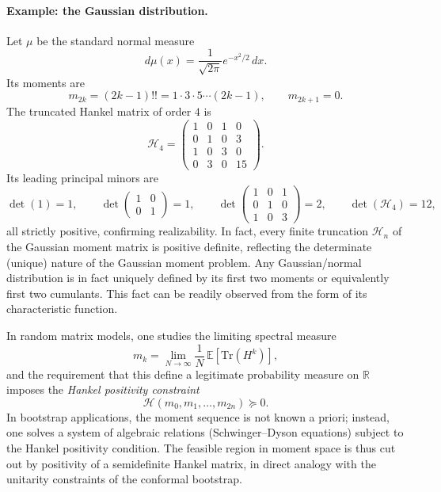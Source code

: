 \documentclass[11pt]{article}
\theoremstyle{plain}
\begin{document}
\medskip

\paragraph{Example: the Gaussian distribution.}
Let $\mu$ be the standard normal measure
\[
d\mu(x) = \frac{1}{\sqrt{2\pi}} e^{-x^2/2}\,dx.
\]
Its moments are
\[
m_{2k} = (2k-1)!! = 1 \cdot 3 \cdot 5 \cdots (2k-1), \qquad m_{2k+1} = 0.
\]
The truncated Hankel matrix of order $4$ is
\[
\mathcal{H}_4 =
\begin{pmatrix}
1 & 0 & 1 & 0 \\
0 & 1 & 0 & 3 \\
1 & 0 & 3 & 0 \\
0 & 3 & 0 & 15
\end{pmatrix}.
\]
Its leading principal minors are
\[
\det(1) = 1,\qquad
\det\!\begin{pmatrix}1&0\\0&1\end{pmatrix} = 1,\qquad
\det\!\begin{pmatrix}1&0&1\\0&1&0\\1&0&3\end{pmatrix} = 2,\qquad
\det(\mathcal{H}_4)= 12,
\]
all strictly positive, confirming realizability.  In fact, every finite truncation
$\mathcal{H}_n$ of the Gaussian moment matrix is positive definite, reflecting the
determinate (unique) nature of the Gaussian moment problem. Any  Gaussian/normal distribution is in fact uniquely defined by its first two moments or equivalently first two cumulants. This fact can be readily observed from the form of its characteristic function.

\medskip

In random matrix models, one studies the limiting spectral measure
\[
m_k = \lim_{N\to\infty} \frac{1}{N}\, \mathbb{E}[\mathrm{Tr}(H^k)],
\]
and the requirement that this define a legitimate probability measure on $\mathbb{R}$
imposes the \emph{Hankel positivity constraint}
\[
\mathcal{H}(m_0,m_1,\dots,m_{2n}) \succeq 0.
\]
In bootstrap applications, the moment sequence is not known a priori; instead,
one solves a system of algebraic relations (Schwinger--Dyson equations) subject
to the Hankel positivity condition.  The feasible region in moment space is thus
cut out by positivity of a semidefinite Hankel matrix, in direct analogy with the
unitarity constraints of the conformal bootstrap.
\end{document}

